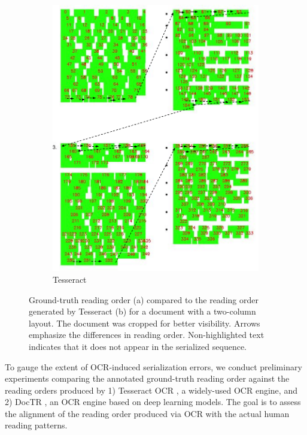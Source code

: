 \begin{figure}[ht]
\begin{subfigure}[b]{0.4\textwidth}
        \includegraphics[width=\textwidth]{images/chapter4/tesseract_multicolumn_with_ro.pdf}
        \caption{Tesseract}
      \end{subfigure}
    \caption{Ground-truth reading order (a) compared to the reading order generated by Tesseract (b) for a document with a two-column layout. The document was cropped for better visibility. Arrows emphasize the differences in reading order. Non-highlighted text indicates that it does not appear in the serialized sequence.}
    \label{fig:reading-orders-multicolumn}
\end{figure}


To gauge the extent of \ac{OCR}-induced serialization errors, we conduct preliminary experiments comparing the annotated ground-truth reading order against the reading orders produced by 1) Tesseract OCR \citep{kay2007tesseract}, a widely-used \ac{OCR} engine, and 2) DocTR \citep{doctr2021}, an \ac{OCR} engine based on deep learning models. The goal is to assess the alignment of the reading order produced via \ac{OCR} with the actual human reading patterns.

